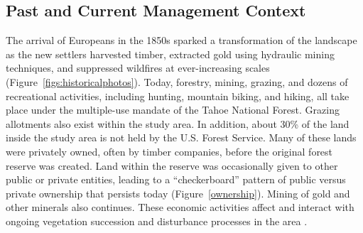 
\subsection{Past and Current Management Context}

The arrival of Europeans in the 1850s sparked a transformation of the landscape as the new settlers harvested timber, extracted gold using hydraulic mining techniques, and suppressed wildfires at ever-increasing scales \citep{Storer1963} (Figure~\ref{figs:historicalphotos}). Today, forestry, mining, grazing, and dozens of recreational activities, including hunting, mountain biking, and hiking, all take place under the multiple-use mandate of the Tahoe National Forest. Grazing allotments also exist within the study area. In addition, 
about 30\% of the land inside the study area is not held by the U.S. Forest Service. Many of these lands were privately owned, often by timber companies, before the original forest reserve was created. Land within the reserve was occasionally given to other public or private entities, leading to a ``checkerboard'' pattern of public versus private ownership that persists today (Figure~\ref{ownership}). Mining of gold and other minerals also continues. These economic activities affect and interact with ongoing vegetation succession and disturbance processes in the area \citep{USDAForestService2014}.

